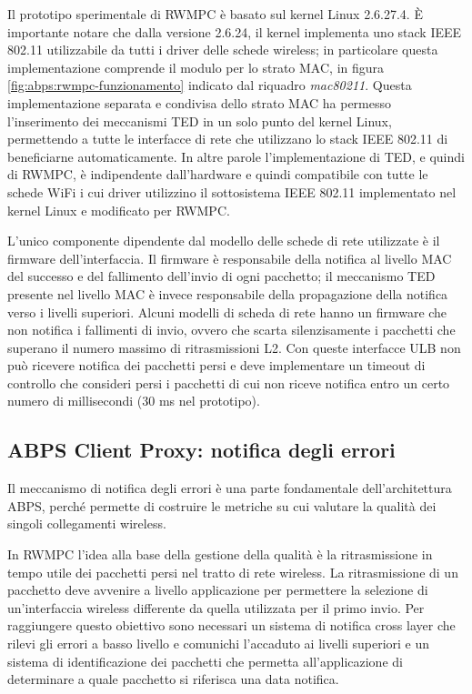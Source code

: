 \documentclass[12pt,a4paper,openright,twoside,draft]{book}
\begin{document}
Il prototipo sperimentale di RWMPC è basato sul kernel Linux
2.6.27.4. È importante notare che dalla versione 2.6.24, il kernel
implementa uno stack IEEE 802.11 utilizzabile da tutti i driver delle
schede wireless; in particolare questa implementazione comprende il
modulo per lo strato MAC, in figura \ref{fig:abps:rwmpc-funzionamento}
indicato dal riquadro \emph{mac80211}. Questa implementazione separata
e condivisa dello strato MAC ha permesso l'inserimento dei meccanismi
TED in un solo punto del kernel Linux, permettendo a tutte le
interfacce di rete che utilizzano lo stack IEEE 802.11 di beneficiarne
automaticamente. In altre parole l'implementazione di TED, e quindi di
RWMPC, è indipendente dall'hardware e quindi compatibile con tutte le
schede WiFi i cui driver utilizzino il sottosistema IEEE 802.11
implementato nel kernel Linux e modificato per RWMPC.

L'unico componente dipendente dal modello delle schede di rete
utilizzate è il firmware dell'interfaccia. Il firmware è responsabile
della notifica al livello MAC del successo e del fallimento dell'invio
di ogni pacchetto; il meccanismo TED presente nel livello MAC è invece
responsabile della propagazione della notifica verso i livelli
superiori. Alcuni modelli di scheda di rete hanno un firmware che non
notifica i fallimenti di invio, ovvero che scarta silenzisamente i
pacchetti che superano il numero massimo di ritrasmissioni L2. Con
queste interfacce ULB non può ricevere notifica dei pacchetti persi e
deve implementare un timeout di controllo che consideri persi i
pacchetti di cui non riceve notifica entro un certo numero di
millisecondi (30 ms nel prototipo).

\subsection{ABPS Client Proxy: notifica degli errori}

Il meccanismo di notifica degli errori è una parte fondamentale
dell'architettura ABPS, perché permette di costruire le metriche su
cui valutare la qualità dei singoli collegamenti wireless.

In RWMPC l'idea alla base della gestione della qualità è la
ritrasmissione in tempo utile dei pacchetti persi nel tratto di rete
wireless. La ritrasmissione di un pacchetto deve avvenire a livello
applicazione per permettere la selezione di un'interfaccia wireless
differente da quella utilizzata per il primo invio. Per raggiungere
questo obiettivo sono necessari un sistema di notifica cross layer che
rilevi gli errori a basso livello e comunichi l'accaduto ai livelli
superiori e un sistema di identificazione dei pacchetti che permetta
all'applicazione di determinare a quale pacchetto si riferisca una
data notifica.
\end{document}
